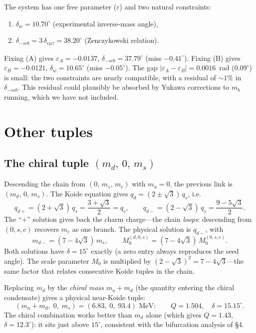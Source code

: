 \documentclass[11pt]{article}
\begin{document}
The system has one free parameter ($\varepsilon$) and two
natural constraints:
\begin{enumerate}
  \item[(A)] $\delta_w = 10.70^\circ$ (experimental inverse-mass angle),
  \item[(B)] $\delta_{-scb} = 3\,\delta_{e\mu\tau} = 38.20^\circ$
    (Zenczykowski relation).
\end{enumerate}
Fixing (A) gives $\varepsilon_A = -0.0137$, $\delta_{-scb} = 37.79^\circ$
(miss $-0.41^\circ$).
Fixing (B) gives $\varepsilon_B = -0.0121$, $\delta_w = 10.65^\circ$
(miss $-0.05^\circ$).
The gap $|\varepsilon_A - \varepsilon_B| = 0.0016$~rad ($0.09^\circ$)
is small: the two constraints are nearly compatible, with a residual
of $\sim 1\%$ in $\delta_{-scb}$.
This residual could plausibly be absorbed by Yukawa corrections
to $m_b$ running, which we have not included.

\section{Other tuples}

\subsection{The chiral tuple $(m_d,\,0,\,m_s)$}

Descending the chain from $(0,\,m_s,\,m_c)$ with $m_u = 0$,
the previous link is $(m_d,\,0,\,m_s)$.  The Koide equation
gives $q_d = (2\pm\sqrt3)\,q_s$, i.e.
\[
  q_{d+} = (2+\sqrt3)\,q_s = \frac{3+\sqrt3}{2} = q_c,
  \qquad
  q_{d-} = (2-\sqrt3)\,q_s = \frac{9-5\sqrt3}{2}.
\]
The ``$+$'' solution gives back the charm charge---the chain
\emph{loops}: descending from $(0,s,c)$ recovers $m_c$ as one branch.
The physical solution is $q_{d-}$, with
\[
  m_{d-} = (7-4\sqrt3)\,m_s,
  \qquad
  M_0^{(d,0,s)} = (7-4\sqrt3)\,M_0^{(0,s,c)}.
\]
Both solutions have $\delta = 15^\circ$ exactly (a zero entry
always reproduces the seed angle).  The scale parameter
$M_0$ is multiplied by $(2-\sqrt3)^2 = 7-4\sqrt3$---the same
factor that relates consecutive Koide tuples in the chain.

\medskip\noindent
Replacing $m_d$ by the \emph{chiral mass} $m_u + m_d$
(the quantity entering the chiral condensate) gives a physical
near-Koide tuple:
\[
  (m_u\!+\!m_d,\; 0,\; m_s) = (6.83,\;0,\;93.4)\text{ MeV}:
  \qquad Q = 1.504,\quad \delta = 15.15^\circ.
\]
The chiral combination works better than $m_d$ alone
(which gives $Q=1.43$, $\delta=12.3^\circ$): it sits just
above $15^\circ$, consistent with the bifurcation analysis of \S4.
\end{document}
